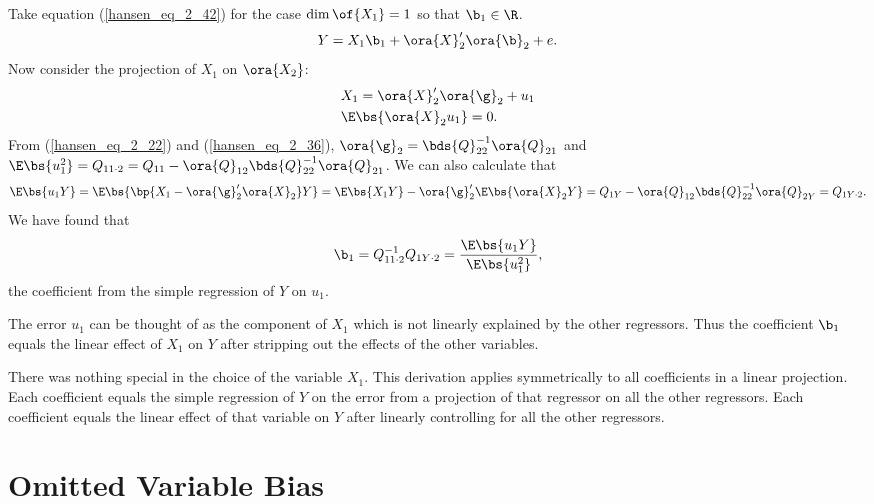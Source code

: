 Take equation (\ref{hansen_eq_2_42}) for the case $\dim\of{X_1} = 1$ so that $\b_1 \in \R$.
\begin{equation}
    \label{hansen_eq_2_44}
    Y = X_1 \b_1 + \ora{X}_2^{\prime} \ora{\b}_2 + e.
\end{equation}
Now consider the projection of $X_1$ on $\ora{X_2}$:
\begin{equation}
    \notag 
    \begin{aligned}
        & X_1 = \ora{X}_2^{\prime} \ora{\g}_2 + u_1 \\
        & \E\bs{\ora{X}_2 u_1} = 0.
    \end{aligned}
\end{equation}
From (\ref{hansen_eq_2_22}) and (\ref{hansen_eq_2_36}), $\ora{\g}_2 = \bds{Q}_{22}^{-1} \ora{Q}_{21}$ and $\E\bs{u_1^2} = Q_{11 \cdot 2} = Q_{11} - \ora{Q}_{12} \bds{Q}_{22}^{-1} \ora{Q}_{21}$. We can also calculate that 
\begin{equation}
    \notag 
    \E\bs{u_1 Y} = \E\bs{\bp{X_1 - \ora{\g}_2^{\prime} \ora{X}_2} Y} = \E\bs{X_1 Y} - \ora{\g}_2^{\prime} \E\bs{\ora{X}_2 Y} = Q_{1Y} - \ora{Q}_{12} \bds{Q}_{22}^{-1} \ora{Q}_{2Y} = Q_{1Y \cdot 2}.
\end{equation}
We have found that 
\begin{equation}
    \notag 
    \b_1 = Q_{11 \cdot 2}^{-1} Q_{1Y \cdot 2} = \frac{\E\bs{u_1 Y}}{\E\bs{u_1^2}},
\end{equation}
the coefficient from the simple regression of $Y$ on $u_1$.

 The error $u_1$ can be thought of as the component of $X_1$ which is not linearly explained by the other regressors. Thus the coefficient $\b_1$ equals the linear effect of $X_1$ on $Y$ after stripping out the effects of the other variables.

There was nothing special in the choice of the variable $X_1$. This derivation applies symmetrically to all coefficients in a linear projection. Each coefficient equals the simple regression of $Y$ on the error from a projection of that regressor on all the other regressors. Each coefficient equals the linear effect of that variable on $Y$ after linearly controlling for all the other regressors.

\section{Omitted Variable Bias}

